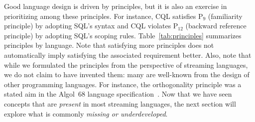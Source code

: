 Good language design is driven by principles, but it is also an
exercise in prioritizing among these principles. For instance, CQL
satisfies P$_9$ (familiarity principle) by adopting SQL's syntax and
CQL violates P$_{12}$ (backward reference principle) by adopting SQL's
scoping rules. Table~\ref{tab:principles} summarizes principles by
language. Note that satisfying more principles does not automatically
imply satisfying the associated requirement better. Also, note that while
we formulated the principles from the perspective of streaming
languages, we do not claim to have invented them: many are well-known
from the design of other programming languages. For instance, the
orthogonality principle was a stated aim in the Algol~68 language
specification~\cite{vanwijngaarden_et_al_1975}. Now that we have seen
concepts that are \emph{present} in most streaming languages, the next
section will explore what is commonly \emph{missing or
  underdeveloped}.
